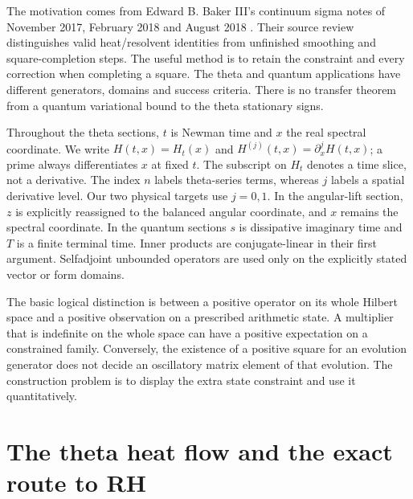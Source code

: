 \documentclass[11pt]{article}
\numberwithin{equation}{section}
\theoremstyle{definition}
\theoremstyle{remark}
\begin{document}
The motivation comes from Edward B. Baker III's continuum sigma notes
of November 2017, February 2018 and August 2018
\cite{baker2017,baker2018heat,baker2018dirac}. Their source review
\cite{seedreview} distinguishes valid heat/resolvent identities from
unfinished smoothing and square-completion steps. The useful method is
to retain the constraint and every correction when completing a square.
The theta and quantum applications have different generators, domains and
success criteria. There is no transfer theorem from a quantum variational
bound to the theta stationary signs.

Throughout the theta sections, $t$ is Newman time and $x$ the real spectral
coordinate. We write $H(t,x)=H_t(x)$ and
$H^{(j)}(t,x)=\partial_x^jH(t,x)$; a prime always differentiates $x$
at fixed $t$. The subscript on $H_t$ denotes a time slice, not a derivative.
The index $n$ labels theta-series terms, whereas $j$ labels a spatial
derivative level. Our two physical targets use $j=0,1$.
In the angular-lift section, $z$ is explicitly reassigned to the balanced
angular coordinate, and $x$ remains the spectral coordinate.
In the quantum sections $s$ is dissipative imaginary time and $T$ is a
finite terminal time. Inner products are conjugate-linear in their first
argument. Selfadjoint unbounded operators are used only on the explicitly
stated vector or form domains.

The basic logical distinction is between a positive operator on its whole
Hilbert space and a positive observation on a prescribed arithmetic state.
A multiplier that is indefinite on the whole space can have a positive
expectation on a constrained family. Conversely, the existence of a
positive square for an evolution generator does not decide an oscillatory
matrix element of that evolution. The construction problem is to display
the extra state constraint and use it quantitatively.


\section{The theta heat flow and the exact route to RH}
\label{sec:background-heat}
\end{document}
